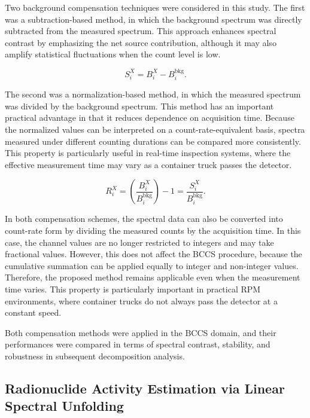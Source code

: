 \documentclass[10pt]{wlscirep}
\begin{document}
Two background compensation techniques were considered in this study. The first was a subtraction-based method, in which the background spectrum was directly subtracted from the measured spectrum. This approach enhances spectral contrast by emphasizing the net source contribution, although it may also amplify statistical fluctuations when the count level is low.

\begin{equation}
S^X_i =  B^X_i - B_i^{\textrm{bkg}}. \label{eq:DS}
\end{equation}

The second was a normalization-based method, in which the measured spectrum was divided by the background spectrum. This method has an important practical advantage in that it reduces dependence on acquisition time. Because the normalized values can be interpreted on a count-rate-equivalent basis, spectra measured under different counting durations can be compared more consistently. This property is particularly useful in real-time inspection systems, where the effective measurement time may vary as a container truck passes the detector.

\begin{equation}
R^X_i = \left(\dfrac{B^X_i}{B^{\textrm{bkg}}_i}\right) -1=\dfrac{S^X_i}{B_i^{\text{bkg}}}.\label{eq:NB}
\end{equation}

In both compensation schemes, the spectral data can also be converted into count-rate form by dividing the measured counts by the acquisition time. In this case, the channel values are no longer restricted to integers and may take fractional values. However, this does not affect the BCCS procedure, because the cumulative summation can be applied equally to integer and non-integer values. Therefore, the proposed method remains applicable even when the measurement time varies. This property is particularly important in practical RPM environments, where container trucks do not always pass the detector at a constant speed.

Both compensation methods were applied in the BCCS domain, and their performances were compared in terms of spectral contrast, stability, and robustness in subsequent decomposition analysis.

\subsection*{Radionuclide Activity Estimation via Linear Spectral Unfolding}
\end{document}
